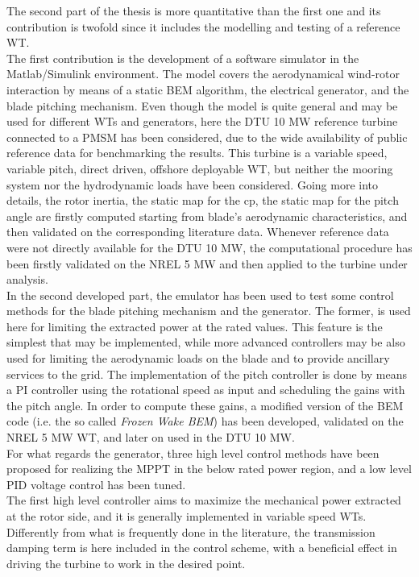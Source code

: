 The second part of the thesis is more quantitative than the first one and its contribution is twofold since it includes the modelling and testing of a reference WT. \\
The first contribution is the development of a software simulator in the Matlab/Simulink environment. The model covers the aerodynamical wind-rotor interaction by means of a static \acrfull{BEM} algorithm, the electrical generator, and the blade pitching mechanism. Even though the model is quite general and may be used for different WTs and generators, here the DTU 10 MW reference turbine connected to a \acrfull{PMSM} has been considered, due to the wide availability of public reference data for benchmarking the results. This turbine is a variable speed, variable pitch, direct driven, offshore deployable WT, but neither the mooring system nor the hydrodynamic loads have been considered. Going more into details, the rotor inertia, the static map for the \acrfull{cp}, the static map for the pitch angle are firstly computed starting from blade's aerodynamic characteristics, and then validated on the corresponding literature data. Whenever reference data were not directly available for the DTU 10 MW, the computational procedure has been firstly validated on the NREL 5 MW and then applied to the turbine under analysis.\\
In the second developed part, the emulator has been used to test some control methods for the blade pitching mechanism and the generator. The former, is used here for limiting the extracted power at the rated values. This feature is the simplest that may be implemented, while more advanced controllers may be also used for limiting the aerodynamic loads on the blade and to provide ancillary services to the grid. The implementation of the pitch controller is done by means a \acrfull{PI} controller using the rotational speed as input and scheduling the gains with the pitch angle. In order to compute these gains, a modified version of the BEM code (i.e. the so called \textit{Frozen Wake BEM}) has been developed, validated on the NREL 5 MW WT, and later on used in the DTU 10 MW.\\
For what regards the generator, three high level control methods have been proposed for realizing the \acrfull{MPPT} in the below rated power region, and a low level \acrfull{PID} voltage control has been tuned. \\
The first high level controller aims to maximize the mechanical power extracted at the rotor side, and it is generally implemented in variable speed WTs. Differently from what is frequently done in the literature, the transmission damping term is here included in the control scheme, with a beneficial effect in driving the turbine to work in the desired point.\\
